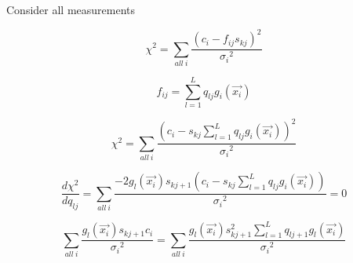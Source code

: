 \documentclass[12pt,a4paper,twoside]{article}
\begin{document}
Consider all measurements

\begin{equation}
\chi^2 = \sum_{all~i} \frac{(c_i-f_{ij}s_{kj})^2}{{\sigma_i}^2}
\end{equation}

\begin{equation}
f_{ij} = \sum_{l = 1}^L q_{lj} g_i(\vec{x_i})
\end{equation}

\begin{equation}
\chi^2 = \sum_{all~i} \frac{(c_i- s_{kj} \sum_{l = 1}^L q_{lj} g_i(\vec{x_i}))^2}{{\sigma_i}^2}
\end{equation}

\begin{equation}
\frac{d\chi^2}{dq_{lj}} = \sum_{all~i} \frac{-2 g_l(\vec{x_i}) s_{kj+1} (c_i- s_{kj} \sum_{l = 1}^L q_{lj} g_i(\vec{x_i}))}{{\sigma_i}^2} = 0
\end{equation}

\begin{equation}
\sum_{all~i} \frac{g_l(\vec{x_i}) s_{kj+1} c_i}{{\sigma_i}^2} = \sum_{all~i} \frac{g_l(\vec{x_i}) s_{kj+1}^2 \sum_{l = 1}^L q_{lj+1} g_l(\vec{x_i})}{{\sigma_i}^2}
\end{equation}
\end{document}
